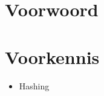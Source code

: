 \documentclass[indexstructuren.tex]{subfiles}
\begin{document}
\section*{Voorwoord}


\section*{Voorkennis}
\begin{itemize}
\item Hashing
\end{itemize}
\end{document}
